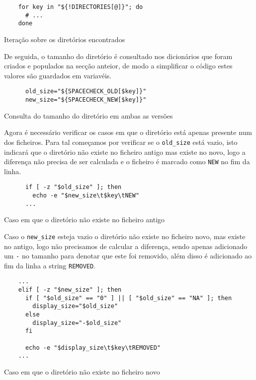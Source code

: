 \begin{listing}[H]
	\centering
	\begin{verbatim}
    for key in "${!DIRECTORIES[@]}"; do
      # ...
    done
  \end{verbatim}
	\caption{Iteração sobre os diretórios encontrados}
	\label{code:implementation_dirs_loop}
\end{listing}

De seguida, o tamanho do diretório é consultado nos dicionários que foram criados
e populados na secção anteior, de modo a simplificar o código estes valores são
guardados em variavéis.

\begin{listing}[H]
	\centering
	\begin{verbatim}
      old_size="${SPACECHECK_OLD[$key]}"
      new_size="${SPACECHECK_NEW[$key]}"
  \end{verbatim}
	\caption{Consulta do tamanho do diretório em ambas as versões}
\end{listing}

Agora é necessário verificar os casos em que o diretório está apenas presente
num dos ficheiros. Para tal começamos por verificar se o \Verb|old_size| está
vazio, isto indicará que o diretório não existe no ficheiro antigo mas existe
no novo, logo a diferença não precisa de ser calculada e o ficheiro é marcado
como \Verb|NEW| no fim da linha.

\begin{listing}[H]
	\centering
	\begin{verbatim}
      if [ -z "$old_size" ]; then
        echo -e "$new_size\t$key\tNEW"
      ...
  \end{verbatim}
	\caption{Caso em que o diretório não existe no ficheiro antigo}
\end{listing}

Caso o \Verb|new_size| esteja vazio o diretório não existe no ficheiro novo,
mas existe no antigo, logo não precisamos de calcular a diferença, sendo apenas
adicionado um \Verb|-| no tamanho para denotar que este foi removido, além disso
é adicionado ao fim da linha a string \Verb|REMOVED|.

\begin{listing}[H]
	\centering
	\begin{verbatim}
    ...
    elif [ -z "$new_size" ]; then
      if [ "$old_size" == "0" ] || [ "$old_size" == "NA" ]; then
        display_size="$old_size"
      else
        display_size="-$old_size"
      fi

      echo -e "$display_size\t$key\tREMOVED"
    ...
  \end{verbatim}
	\caption{Caso em que o diretório não existe no ficheiro novo}
	\label{code:implementation_new_size_empty}
\end{listing}

